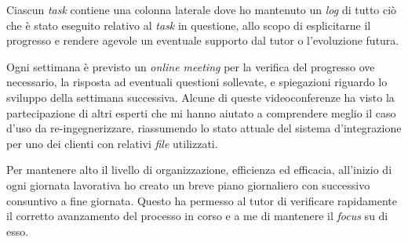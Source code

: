 Ciascun \textit{task} contiene una colonna laterale dove ho mantenuto un \textit{log} di tutto ciò che è stato eseguito relativo al \textit{task} in questione, allo scopo di esplicitarne il progresso e rendere agevole un eventuale supporto dal tutor o l'evoluzione futura.

Ogni settimana è previsto un \textit{online meeting} per la verifica del progresso ove necessario, la risposta ad eventuali questioni sollevate, e spiegazioni riguardo lo sviluppo della settimana successiva.
Alcune di queste videoconferenze ha visto la partecipazione di altri esperti che mi hanno aiutato a comprendere meglio il caso d'uso da re-ingegnerizzare, riassumendo lo stato attuale del sistema d'integrazione per uno dei clienti con relativi \textit{file} utilizzati.

Per mantenere alto il livello di organizzazione, efficienza ed efficacia, all'inizio di ogni giornata lavorativa ho creato un breve piano giornaliero con successivo consuntivo a fine giornata.
Questo ha permesso al tutor di verificare rapidamente il corretto avanzamento del processo in corso e a me di mantenere il \textit{focus} su di esso.



